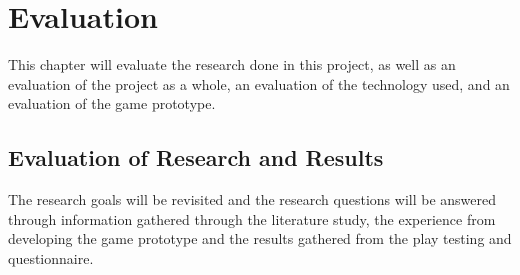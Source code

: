 \chapter{Evaluation}
This chapter will evaluate the research done in this project, as well as an evaluation of the project as a whole, an evaluation of the technology used, and an evaluation of the game prototype.


\section{Evaluation of Research and Results}
The research goals will be revisited and the research questions will be answered through information gathered through the literature study, the experience from developing the game prototype and the results gathered from the play testing and questionnaire.

